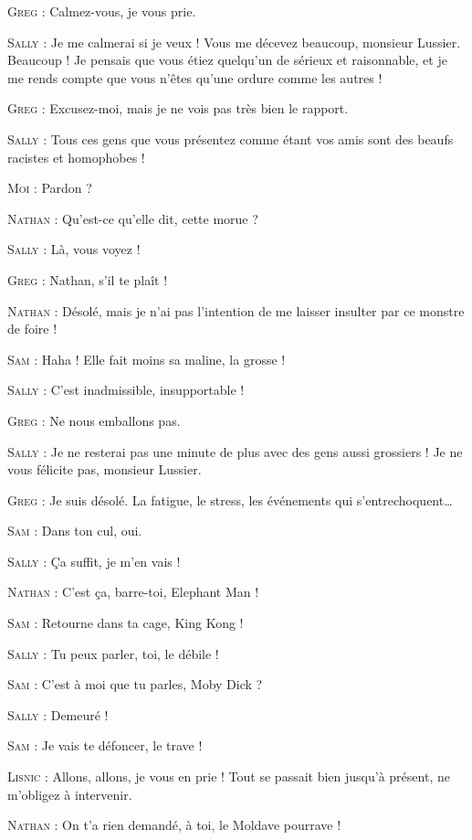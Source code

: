 \begin{dialogue}
\textsc{Greg} : Calmez-vous, je vous prie.

\textsc{Sally} : Je me calmerai si je veux ! Vous me décevez beaucoup, monsieur Lussier. Beaucoup ! Je pensais que vous étiez quelqu’un de sérieux et raisonnable, et je me rends compte que vous n’êtes qu’une ordure comme les autres !

\textsc{Greg} : Excusez-moi, mais je ne vois pas très bien le rapport.

\textsc{Sally} : Tous ces gens que vous présentez comme étant vos amis sont des beaufs racistes et homophobes !

\textsc{Moi} : Pardon ?

\textsc{Nathan} : Qu’est-ce qu’elle dit, cette morue ?

\textsc{Sally} : Là, vous voyez !

\textsc{Greg} : Nathan, s’il te plaît !

\textsc{Nathan} : Désolé, mais je n’ai pas l’intention de me laisser insulter par ce monstre de foire !

\textsc{Sam} : Haha ! Elle fait moins sa maline, la grosse !

\textsc{Sally} : C’est inadmissible, insupportable !

\textsc{Greg} : Ne nous emballons pas.

\textsc{Sally} : Je ne resterai pas une minute de plus avec des gens aussi grossiers ! Je ne vous félicite pas, monsieur Lussier.

\textsc{Greg} : Je suis désolé. La fatigue, le stress, les événements qui s’entrechoquent…

\textsc{Sam} : Dans ton cul, oui.

\textsc{Sally} : Ça suffit, je m’en vais !

\textsc{Nathan} : C’est ça, barre-toi, Elephant Man !

\textsc{Sam} : Retourne dans ta cage, King Kong !

\textsc{Sally} : Tu peux parler, toi, le débile !

\textsc{Sam} : C’est à moi que tu parles, Moby Dick ?

\textsc{Sally} : Demeuré !

\textsc{Sam} : Je vais te défoncer, le trave !

\textsc{Lisnic} : Allons, allons, je vous en prie ! Tout se passait bien jusqu’à présent, ne m’obligez à intervenir.

\textsc{Nathan} : On t’a rien demandé, à toi, le Moldave pourrave !


\end{dialogue}
